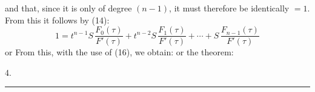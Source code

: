 and that, since it is only of degree $(n-1)$, it must therefore be identically $=1$.
From this it follows by (14):
\[
1 = t^{n-1} S\,\frac{F_0(\tau)}{F'(\tau)} + t^{n-2} S\,\frac{F_1(\tau)}{F'(\tau)} + \cdots + S\,\frac{F_{n-1}(\tau)}{F'(\tau)}
\]
or
From this, with the use of (16), we obtain:
or the theorem:

4. 

\begin{center}
\rule{0.2\linewidth}{0.4pt}
\end{center}
